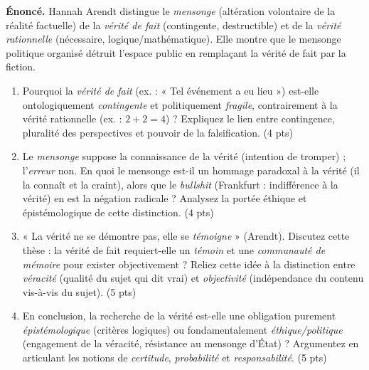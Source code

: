\documentclass[11pt]{article}
\begin{document}
\begin{exercice}
\textbf{Énoncé.} Hannah Arendt distingue le \textit{mensonge} (altération volontaire de la réalité factuelle) de la \textit{vérité de fait} (contingente, destructible) et de la \textit{vérité rationnelle} (nécessaire, logique/mathématique). Elle montre que le mensonge politique organisé détruit l'espace public en remplaçant la vérité de fait par la fiction.

\begin{enumerate}
    \item Pourquoi la \textit{vérité de fait} (ex. : « Tel événement a eu lieu ») est-elle ontologiquement \textit{contingente} et politiquement \textit{fragile}, contrairement à la vérité rationnelle (ex. : $2+2=4$) ? Expliquez le lien entre contingence, pluralité des perspectives et pouvoir de la falsification. (4 pts)
    \item Le \textit{mensonge} suppose la connaissance de la vérité (intention de tromper) ; l'\textit{erreur} non. En quoi le mensonge est-il un hommage paradoxal à la vérité (il la connaît et la craint), alors que le \textit{bullshit} (Frankfurt : indifférence à la vérité) en est la négation radicale ? Analysez la portée éthique et épistémologique de cette distinction. (4 pts)
    \item « La vérité ne se démontre pas, elle se \textit{témoigne} » (Arendt). Discutez cette thèse : la vérité de fait requiert-elle un \textit{témoin} et une \textit{communauté de mémoire} pour exister objectivement ? Reliez cette idée à la distinction entre \textit{véracité} (qualité du sujet qui dit vrai) et \textit{objectivité} (indépendance du contenu vis-à-vis du sujet). (5 pts)
    \item En conclusion, la recherche de la vérité est-elle une obligation purement \textit{épistémologique} (critères logiques) ou fondamentalement \textit{éthique/politique} (engagement de la véracité, résistance au mensonge d'État) ? Argumentez en articulant les notions de \textit{certitude}, \textit{probabilité} et \textit{responsabilité}. (5 pts)
\end{enumerate}
\end{exercice}
\end{document}
